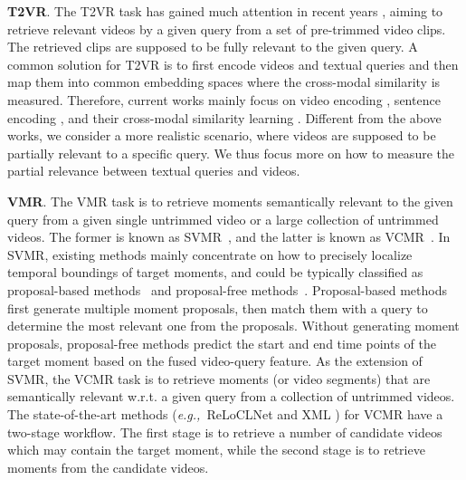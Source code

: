 \documentclass[sigconf]{acmart}
\newcommand{\eg}{\emph{e.g.,}~}
\begin{document}
\textbf{T2VR}. The T2VR task has gained much attention in recent years \cite{dong2018predicting,song2019Polysemous,chen2020fine,ging2020coot,sigir2020tree,han2021fine,liu2021progressive,wang2020learning,eccv2022-laff}, aiming to retrieve relevant videos by a given query from a set of pre-trimmed  video clips. The retrieved clips are supposed to be fully relevant to the given query.
A common solution for T2VR is to first encode videos and textual queries and then map them into common embedding spaces where the cross-modal similarity is measured.
Therefore, current works mainly focus on video encoding \cite{liu2019use,jin2021hierarchical,feng2021exploiting,song2021spatial}, sentence encoding \cite{chen2020fine,li2020sea,croitoru2021teachtext}, and their cross-modal similarity learning \cite{yu2018joint,dong2021dual,gabeur2020multi,wu2021hanet}.
Different from the above works, we consider a more realistic scenario, 
where videos are supposed to be partially relevant to a specific query. We thus focus more on how to measure the partial relevance between textual queries and videos.



\textbf{VMR}. The VMR task is to retrieve moments semantically relevant to the given query from a given single untrimmed video or a large collection of untrimmed videos.
The former is known as SVMR~\cite{anne2017localizing,liu2021context,zheng2022progressive,qu2020fine,liu2020jointly,yang2022video,wang2021visual}, and the latter is known as VCMR~\cite{escorcia2019temporal,paul2021text,zhang2020hierarchical,wang2022siamese}.
In SVMR, existing methods mainly concentrate on how to precisely localize temporal boundings of target moments, and could be typically classified as proposal-based methods~\cite{chen2018temporally,yuan2019semantic,zhang2019man,wang2020temporally,gao2021fast} and proposal-free methods~\cite{yuan2019find,qu2020fine,chen2020rethinking}.
Proposal-based methods first generate multiple moment proposals, then match them with a query to determine the most relevant one from the proposals. Without generating moment proposals, proposal-free methods predict the start and end time points of the target moment based on the fused video-query feature.
As the extension of SVMR, the VCMR task is to retrieve moments (or video segments) that are semantically relevant w.r.t. a given query from a collection of untrimmed videos. The state-of-the-art methods (\eg ReLoCLNet \cite{zhang2021video} and XML \cite{lei2020tvr}) for VCMR have a two-stage workflow. The first stage is to retrieve a number of candidate videos which may contain the target moment, while the second stage is to retrieve moments from the candidate videos. 
\end{document}
